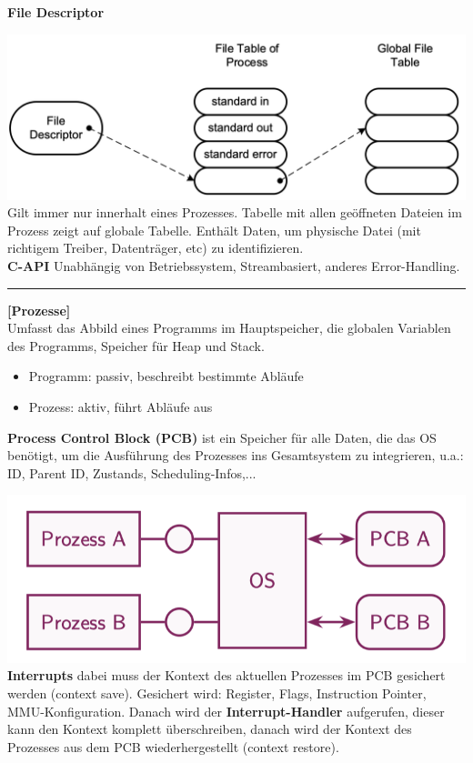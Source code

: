 \documentclass[8pt]{extarticle}
\let\oldtextbf\textbf
\renewcommand{\textbf}{\tiny\oldtextbf}
\begin{document}
\begin{multicols*}{5}
	\textbf{File Descriptor}
		
	\includegraphics[scale=0.2]{File_Descriptor.png}\\
	Gilt immer nur innerhalt eines Prozesses. Tabelle mit allen geöffneten Dateien im Prozess zeigt auf globale Tabelle. Enthält Daten, um physische Datei (mit richtigem Treiber, Datenträger, etc) zu identifizieren.\\
	\textbf{C-API} Unabhängig von Betriebssystem, Streambasiert, anderes Error-Handling.
	\vspace{5pt}\\
	\rule{\linewidth}{0.4pt}
	\textbf{[Prozesse]}\\
	Umfasst das Abbild eines Programms im Hauptspeicher, die globalen Variablen des Programms, Speicher für Heap und Stack. 
	\begin{itemize}[noitemsep, topsep=0pt, leftmargin=*]
		\item Programm: passiv, beschreibt bestimmte Abläufe
		\item Prozess: aktiv, führt Abläufe aus
	\end{itemize}
	\textbf{Process Control Block (PCB)} ist ein Speicher für alle Daten, die das OS benötigt, um die Ausführung des Prozesses ins Gesamtsystem zu integrieren, u.a.: ID, Parent ID, Zustands, Scheduling-Infos,...
		
	\includegraphics[scale=0.3]{PCB.png}\\
	\textbf{Interrupts} dabei muss der Kontext des aktuellen Prozesses im PCB gesichert werden (context save). Gesichert wird: Register, Flags, Instruction Pointer, MMU-Konfiguration. Danach wird der \textbf{Interrupt-Handler} aufgerufen, dieser kann den Kontext komplett überschreiben, danach wird der Kontext des Prozesses aus dem PCB wiederhergestellt (context restore).\\
	

\end{multicols*}
\end{document}
